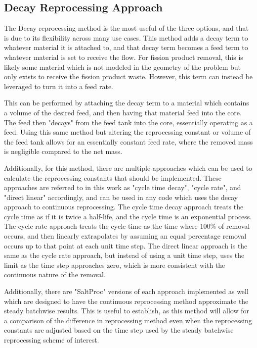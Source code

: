 \subsection{Decay Reprocessing Approach}
The Decay reprocessing method is the most useful of the three options, and that is due to its flexibility across many use cases. This method adds a decay term to whatever material it is attached to, and that decay term becomes a feed term to whatever material is set to receive the flow. For fission product removal, this is likely some material which is not modeled in the geometry of the problem but only exists to receive the fission product waste. However, this term can instead be leveraged to turn it into a feed rate.

This can be performed by attaching the decay term to a material which contains a volume of the desired feed, and then having that material feed into the core. The feed then "decays" from the feed tank into the core, essentially operating as a feed. Using this same method but altering the reprocessing constant or volume of the feed tank allows for an essentially constant feed rate, where the removed mass is negligible compared to the net mass.

Additionally, for this method, there are multiple approaches which can be used to calculate the reprocessing constants that should be implemented. These approaches are referred to in this work as "cycle time decay", "cycle rate", and "direct linear" accordingly, and can be used in any code which uses the decay approach to continuous reprocessing. The cycle time decay approach treats the cycle time as if it is twice a half-life, and the cycle time is an exponential process. The cycle rate approach treats the cycle time as the time where 100\% of removal occurs, and then linearly extrapolates by assuming an equal percentage removal occurs up to that point at each unit time step. The direct linear approach is the same as the cycle rate approach, but instead of using a unit time step, uses the limit as the time step approaches zero, which is more consistent with the continuous nature of the removal.

Additionally, there are "SaltProc" versions of each approach implemented as well which are designed to have the continuous reprocessing method approximate the steady batchwise results. This is useful to establish, as this method will allow for a comparison of the difference in reprocessing method even when the reprocessing constants are adjusted based on the time step used by the steady batchwise reprocessing scheme of interest.

